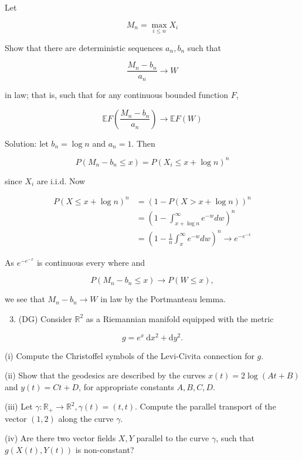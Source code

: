 \documentclass[10pt]{article}
\begin{document}
Let

$$
M_{n}=\max _{i \leq n} X_{i}
$$

Show that there are deterministic sequences $a_{n}, b_{n}$ such that

$$
\frac{M_{n}-b_{n}}{a_{n}} \rightarrow W
$$

in law; that is, such that for any continuous bounded function $F$,

$$
\mathbb{E} F\left(\frac{M_{n}-b_{n}}{a_{n}}\right) \rightarrow \mathbb{E} F(W)
$$

Solution: let $b_{n}=\log n$ and $a_{n}=1$. Then

$$
P\left(M_{n}-b_{n} \leq x\right)=P\left(X_{i} \leq x+\log n\right)^{n}
$$

since $X_{i}$ are i.i.d. Now

$$
\begin{aligned}
P(X \leq x+\log n)^{n} & =(1-P(X>x+\log n))^{n} \\
& =\left(1-\int_{x+\log n}^{\infty} e^{-w} d w\right)^{n} \\
& =\left(1-\frac{1}{n} \int_{x}^{\infty} e^{-w} d w\right)^{n} \rightarrow e^{-e^{-x}}
\end{aligned}
$$

As $e^{-e^{-x}}$ is continuous every where and

$$
P\left(M_{n}-b_{n} \leq x\right) \rightarrow P(W \leq x),
$$

we see that $M_{n}-b_{n} \rightarrow W$ in law by the Portmanteau lemma.

\begin{enumerate}
  \setcounter{enumi}{2}
  \item (DG) Consider $\mathbb{R}^{2}$ as a Riemannian manifold equipped with the metric
\end{enumerate}

$$
g=e^{x} \mathrm{~d} x^{2}+\mathrm{d} y^{2} .
$$

(i) Compute the Christoffel symbols of the Levi-Civita connection for $g$.

(ii) Show that the geodesics are described by the curves $x(t)=2 \log (A t+B)$ and $y(t)=C t+D$, for appropriate constants $A, B, C, D$.

(iii) Let $\gamma: \mathbb{R}_{+} \rightarrow \mathbb{R}^{2}, \gamma(t)=(t, t)$. Compute the parallel transport of the vector $(1,2)$ along the curve $\gamma$.

(iv) Are there two vector fields $X, Y$ parallel to the curve $\gamma$, such that $g(X(t), Y(t))$ is non-constant?
\end{document}
